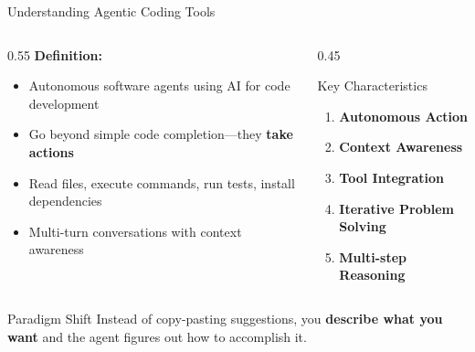 \documentclass[aspectratio=169,11pt]{beamer}
\begin{document}
\begin{frame}{Understanding Agentic Coding Tools}
    \begin{columns}[T]
        \begin{column}{0.55\textwidth}
            \textbf{Definition:}
            \begin{itemize}
                \item Autonomous software agents using AI for code development
                \item Go beyond simple code completion---they \textbf{take actions}
                \item Read files, execute commands, run tests, install dependencies
                \item Multi-turn conversations with context awareness
            \end{itemize}
        \end{column}
        \begin{column}{0.45\textwidth}
            \begin{block}{Key Characteristics}
                \begin{enumerate}
                    \item \textcolor{Garnet}{\textbf{Autonomous Action}}
                    \item \textcolor{Garnet}{\textbf{Context Awareness}}
                    \item \textcolor{Garnet}{\textbf{Tool Integration}}
                    \item \textcolor{Garnet}{\textbf{Iterative Problem Solving}}
                    \item \textcolor{Garnet}{\textbf{Multi-step Reasoning}}
                \end{enumerate}
            \end{block}
        \end{column}
    \end{columns}

    \vspace{0.3cm}
    \begin{alertblock}{Paradigm Shift}
        Instead of copy-pasting suggestions, you \textbf{describe what you want} and the agent figures out how to accomplish it.
    \end{alertblock}

\end{frame}
\end{document}
